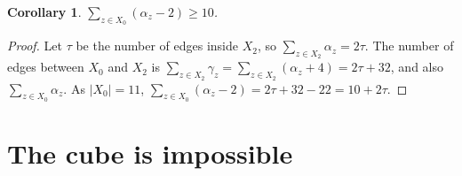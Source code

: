 \documentclass[11pt,a4paper]{article}
\newtheorem{corollary}[theorem]{Corollary}
\theoremstyle{remark}
\begin{document}
\begin{corollary}\label{cor:ten}
$\sum_{z\in X_0}(\alpha_z-2)\ge10$.
\end{corollary}
\begin{proof}
Let $\tau$ be the number of edges inside $X_2$, so $\sum_{z\in X_2}\alpha_z=2\tau$. The number of edges between
$X_0$ and $X_2$ is $\sum_{z\in X_2}\gamma_z=\sum_{z\in X_2}(\alpha_z+4)=2\tau+32$, and also
$\sum_{z\in X_0}\alpha_z$. As $|X_0|=11$, $\sum_{z\in X_0}(\alpha_z-2)=2\tau+32-22=10+2\tau$.
\end{proof}

\section{The cube is impossible}
\end{document}
